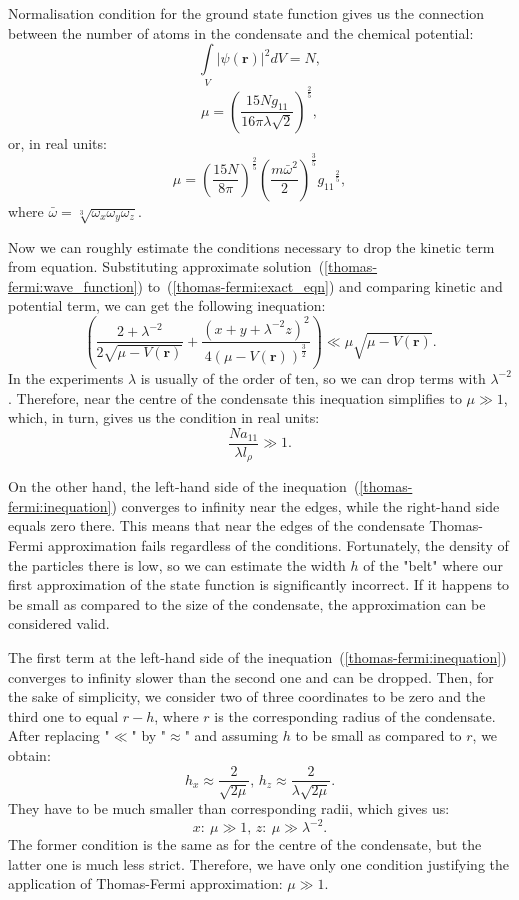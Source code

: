 \documentclass[12pt,notitlepage]{report}
\begin{document}
Normalisation condition for the ground state function gives us the connection
between the number of atoms in the condensate and the chemical potential:
\[ \int\limits_{V} \lvert \psi(\mathbf{r}) \rvert^2 dV = N, \]
\[ \mu = \left( \frac{15 N g_{11}}{16 \pi \lambda \sqrt{2}} \right)^{\frac{2}{5}}, \]
or, in real units:
\[ 
\mu = \left( \frac{15 N}{8 \pi} \right)^\frac{2}{5} 
\left( \frac{m \bar{\omega}^2}{2} \right)^\frac{3}{5}
{g_{11}}^\frac{2}{5},
\]
where $\bar{\omega} = \sqrt[3]{\omega_x \omega_y \omega_z}$.

Now we can roughly estimate the conditions necessary to drop the kinetic term from equation.
Substituting approximate solution~(\ref{thomas-fermi:wave_function}) to~(\ref{thomas-fermi:exact_eqn})
and comparing kinetic and potential term, we can get the following inequation:
\begin{equation}
\label{thomas-fermi:inequation}
\left( 
	\frac{2 + \lambda^{-2}}{2 \sqrt{\mu - V(\mathbf{r})}} +
	\frac{\left( x + y + \lambda^{-2}z \right)^2}{4 \left( \mu - V(\mathbf{r}) \right)^{\frac{3}{2}}} 
\right) \ll
\mu \sqrt{\mu - V(\mathbf{r})}.
\end{equation}
In the experiments $\lambda$ is usually of the order of ten, so we can drop terms with $\lambda^{-2}$.
Therefore, near the centre of the condensate this inequation simplifies to $\mu \gg 1$,
which, in turn, gives us the condition in real units:
\[ \frac{N a_{11}}{\lambda l_\rho} \gg 1. \]

On the other hand, the left-hand side of the inequation~(\ref{thomas-fermi:inequation}) converges to infinity near the edges,
while the right-hand side equals zero there.
This means that near the edges of the condensate Thomas-Fermi approximation fails regardless of the conditions.
Fortunately, the density of the particles there is low, so we can estimate the width $h$ of the "belt"
where our first approximation of the state function is significantly incorrect.
If it happens to be small as compared to the size of the condensate, the approximation can be considered valid.

The first term at the left-hand side of the inequation~(\ref{thomas-fermi:inequation})
converges to infinity slower than the second one and can be dropped.
Then, for the sake of simplicity, we consider two of three coordinates to be zero and the third one to equal $r - h$,
where $r$ is the corresponding radius of the condensate.
After replacing "$\ll$" by "$\approx$" and assuming $h$ to be small as compared to $r$, we obtain:
\[ h_x \approx \frac{2}{\sqrt{2 \mu}},\, h_z \approx \frac{2}{\lambda \sqrt{2 \mu}}. \]
They have to be much smaller than corresponding radii, which gives us:
\[ x:\: \mu \gg 1,\, z:\: \mu \gg \lambda^{-2}. \]
The former condition is the same as for the centre of the condensate, but the latter one is much less strict.
Therefore, we have only one condition justifying the application of Thomas-Fermi approximation: $\mu \gg 1$.
 
\end{document}

